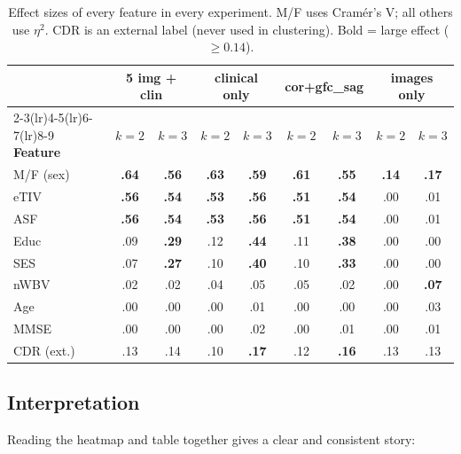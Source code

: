\documentclass[12pt, a4paper]{article}
\begin{document}
\begin{table}[H]
\centering
\caption{Effect sizes of every feature in every experiment. M/F uses Cramér's V;
all others use $\eta^2$. CDR is an external label (never used in clustering).
Bold = large effect ($\geq 0.14$).}
\renewcommand{\arraystretch}{1.15}
\setlength{\tabcolsep}{4pt}
\small
\begin{tabular}{l cc cc cc cc}
\toprule
& \multicolumn{2}{c}{\textbf{5 img + clin}}
& \multicolumn{2}{c}{\textbf{clinical only}}
& \multicolumn{2}{c}{\textbf{cor+gfc\_sag}}
& \multicolumn{2}{c}{\textbf{images only}} \\
\cmidrule(lr){2-3}\cmidrule(lr){4-5}\cmidrule(lr){6-7}\cmidrule(lr){8-9}
\textbf{Feature} & $k{=}2$ & $k{=}3$ & $k{=}2$ & $k{=}3$ & $k{=}2$ & $k{=}3$ & $k{=}2$ & $k{=}3$ \\
\midrule
M/F (sex)  & \textbf{.64} & \textbf{.56} & \textbf{.63} & \textbf{.59} & \textbf{.61} & \textbf{.55} & \textbf{.14} & \textbf{.17} \\
eTIV       & \textbf{.56} & \textbf{.54} & \textbf{.53} & \textbf{.56} & \textbf{.51} & \textbf{.54} & .00 & .01 \\
ASF        & \textbf{.56} & \textbf{.54} & \textbf{.53} & \textbf{.56} & \textbf{.51} & \textbf{.54} & .00 & .01 \\
Educ       & .09 & \textbf{.29} & .12 & \textbf{.44} & .11 & \textbf{.38} & .00 & .00 \\
SES        & .07 & \textbf{.27} & .10 & \textbf{.40} & .10 & \textbf{.33} & .00 & .00 \\
nWBV       & .02 & .02 & .04 & .05 & .05 & .02 & .00 & \textbf{.07} \\
Age        & .00 & .00 & .00 & .01 & .00 & .00 & .00 & .03 \\
MMSE       & .00 & .00 & .00 & .02 & .00 & .01 & .00 & .01 \\
\midrule
CDR (ext.) & .13 & .14 & .10 & \textbf{.17} & .12 & \textbf{.16} & .13 & .13 \\
\bottomrule
\end{tabular}
\label{tab:eta2_full}
\end{table}

\subsection{Interpretation}

Reading the heatmap and table together gives a clear and consistent story:
\end{document}

